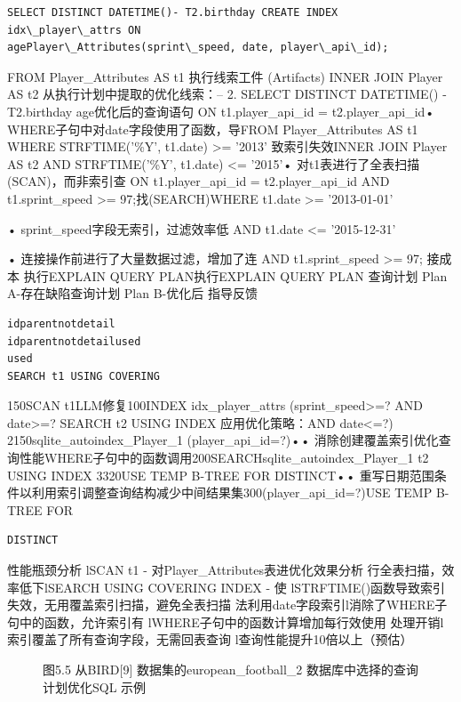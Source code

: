 \documentclass[12pt,a4paper,openright,UTF8]{ctexbook}
\begin{document}
\begin{lstlisting}
SELECT DISTINCT DATETIME()- T2.birthday CREATE INDEX idx\_player\_attrs ON
agePlayer\_Attributes(sprint\_speed, date, player\_api\_id);
\end{lstlisting}
FROM Player\_Attributes AS t1 执行线索工件 (Artifacts) INNER JOIN Player AS t2 从执行计划中提取的优化线索：-- 2. SELECT DISTINCT DATETIME() - T2.birthday age优化后的查询语句 ON t1.player\_api\_id = t2.player\_api\_id• WHERE子句中对date字段使用了函数，导FROM Player\_Attributes AS t1 WHERE STRFTIME('\%Y', t1.date) >= '2013' 致索引失效INNER JOIN Player AS t2 AND STRFTIME('\%Y', t1.date) <= '2015'• 对t1表进行了全表扫描(SCAN)，而非索引查 ON t1.player\_api\_id = t2.player\_api\_id AND t1.sprint\_speed >= 97;找(SEARCH)WHERE t1.date >= '2013-01-01'

• sprint\_speed字段无索引，过滤效率低  AND t1.date <= '2015-12-31'

• 连接操作前进行了大量数据过滤，增加了连  AND t1.sprint\_speed >= 97;
接成本 执行EXPLAIN QUERY PLAN执行EXPLAIN QUERY PLAN 查询计划 Plan A-存在缺陷查询计划 Plan B-优化后 指导反馈

\begin{lstlisting}
idparentnotdetail
idparentnotdetailused
used
SEARCH t1 USING COVERING
\end{lstlisting}
150SCAN t1LLM修复100INDEX idx\_player\_attrs (sprint\_speed>=? AND date>=? SEARCH t2 USING INDEX 应用优化策略：AND date<=?) 2150sqlite\_autoindex\_Player\_1 (player\_api\_id=?)•• 消除创建覆盖索引优化查询性能WHERE子句中的函数调用200SEARCHsqlite\_autoindex\_Player\_1 t2 USING INDEX 3320USE TEMP B-TREE FOR DISTINCT•• 重写日期范围条件以利用索引调整查询结构减少中间结果集300(player\_api\_id=?)USE TEMP B-TREE FOR

\begin{lstlisting}
DISTINCT
\end{lstlisting}
性能瓶颈分析 lSCAN t1 - 对Player\_Attributes表进优化效果分析 行全表扫描，效率低下lSEARCH USING COVERING INDEX - 使 lSTRFTIME()函数导致索引失效，无用覆盖索引扫描，避免全表扫描 法利用date字段索引l消除了WHERE子句中的函数，允许索引有 lWHERE子句中的函数计算增加每行效使用 处理开销l索引覆盖了所有查询字段，无需回表查询 l查询性能提升10倍以上（预估）

\begin{figure}[htbp]
\centering
{}
\caption{图5.5 从BIRD[9] 数据集的european\_football\_2 数据库中选择的查询计划优化SQL 示例}
\end{figure}
\end{document}
